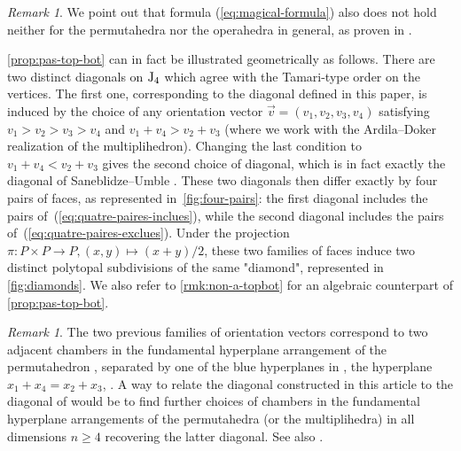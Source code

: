 \documentclass[twoside, 11pt]{amsart}
\theoremstyle{remark}
\newtheorem{remark}[definition]{\sc Remark}
\begin{document}
\begin{remark}
We point out that formula (\ref{eq:magical-formula}) also does not hold neither for the permutahedra nor the operahedra in general, as proven in \cite[Section 3.2]{LA21}. 
\end{remark}

\cref{prop:pas-top-bot} can in fact be illustrated geometrically as follows. 
There are two distinct diagonals on $\mathrm{J}_4$ which agree with the Tamari-type order on the vertices. 
The first one, corresponding to the diagonal defined in this paper, is induced by the choice of any orientation vector $\vec v=(v_1,v_2,v_3,v_4)$ satisfying $v_1>v_2>v_3>v_4$ and $v_1 + v_4 > v_2+v_3$ (where we work with the Ardila--Doker realization of the multiplihedron).
Changing the last condition to $v_1 + v_4 < v_2+v_3$ gives the second choice of diagonal, which is in fact exactly the diagonal of Saneblidze--Umble \cite[Section 5]{SaneblidzeUmble04}. 
These two diagonals then differ exactly by four pairs of faces, as represented in~\cref{fig:four-pairs}: the first diagonal includes the pairs of~(\ref{eq:quatre-paires-inclues}), while the second diagonal includes the pairs of~(\ref{eq:quatre-paires-exclues}).
Under the projection $\pi : P\times P \to P, (x,y) \mapsto (x+y)/2$, these two families of faces induce two distinct polytopal subdivisions of the same "diamond", represented in \cref{fig:diamonds}. 
We also refer to \cref{rmk:non-a-topbot} for an algebraic counterpart of \cref{prop:pas-top-bot}.

\begin{remark}
  The two previous families of orientation vectors correspond to two adjacent chambers in the fundamental hyperplane arrangement of the permutahedron \cite[Theorem 3.6]{LA21}, separated by one of the blue hyperplanes in \cite[Figure 12]{LA21}, the hyperplane $x_1+x_4=x_2+x_3$, .
  A way to relate the diagonal constructed in this article to the diagonal of \cite[Section 5]{SaneblidzeUmble04} would be to find further choices of chambers in the fundamental hyperplane arrangements of the permutahedra (or the multiplihedra) in all dimensions $n \geq 4$ recovering the latter diagonal. See also \cite[Remark~3.18]{LA21}.
\end{remark}
\end{document}
